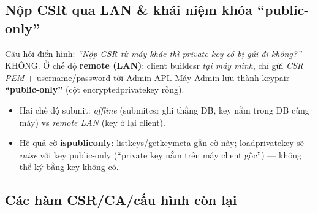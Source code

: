 \documentclass[12pt,a4paper]{article}
\newcommand{\code}[1]{{\ttfamily\small\def\_{\textunderscore\discretionary{}{}{}}#1}}
\begin{document}
\subsection{Nộp CSR qua LAN \& khái niệm khóa ``public-only''}

\begin{warnbox}
Câu hỏi điển hình: \emph{``Nộp CSR từ máy khác thì private key có bị gửi đi không?''}
--- KHÔNG. Ở chế độ \textbf{remote (LAN)}: client \code{build\_csr} \emph{tại máy
mình}, chỉ gửi \emph{CSR PEM} $+$ username/password tới Admin API. Máy Admin lưu
thành keypair \textbf{``public-only''} (cột \code{encrypted\_private\_key} rỗng).
\end{warnbox}

\begin{itemize}
  \item Hai chế độ submit: \emph{offline} (\code{submit\_csr} ghi thẳng DB, key nằm
        trong DB cùng máy) vs \emph{remote LAN} (key ở lại client).
  \item Hệ quả cờ \textbf{\code{is\_public\_only}}: \code{list\_keys}/\code{get\_key\_meta}
        gắn cờ này; \code{load\_private\_key} sẽ \emph{raise} với key public-only
        (``private key nằm trên máy client gốc'') --- không thể ký bằng key không có.
\end{itemize}

\subsection{Các hàm CSR/CA/cấu hình còn lại}
\end{document}
